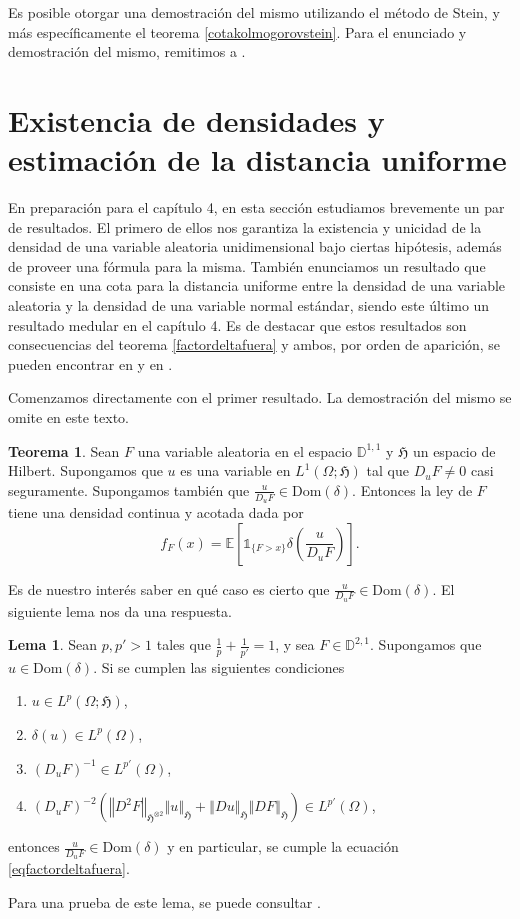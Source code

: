 \documentclass[letterpaper,twoside,12pt]{book}
\newcommand{\D}{\mathbb{D}}
\newcommand{\E}{\mathbb{E}}
\newcommand{\1}{\mathds{1}}
\newcommand{\norm}[1]{\left\Vert #1 \right\Vert}
\theoremstyle{definition}
\theoremstyle{definition}
\newtheorem{teo}{Teorema}
\theoremstyle{remark}
\theoremstyle{definition}
\theoremstyle{definition}
\theoremstyle{definition}
\theoremstyle{definition}
\theoremstyle{definition}
\newtheorem{lema}{Lema}
\begin{document}
Es posible otorgar una demostración del mismo utilizando el método de Stein, y más específicamente el teorema \ref{cotakolmogorovstein}. Para el enunciado y demostración del mismo, remitimos a \cite[sección 3.7]{Nourdin_Peccati_2012}.

\section{Existencia de densidades y estimación de la distancia uniforme}

En preparación para el capítulo 4, en esta sección estudiamos brevemente un par de resultados. El primero de ellos nos garantiza la existencia y unicidad de la densidad de una variable aleatoria unidimensional bajo ciertas hipótesis, además de proveer una fórmula para la misma. También enunciamos un resultado que consiste en una cota para la distancia uniforme entre la densidad de una variable aleatoria y la densidad de una variable normal estándar, siendo este último un resultado medular en el capítulo 4. Es de destacar que estos resultados son consecuencias del teorema \ref{factordeltafuera} y ambos, por orden de aparición, se pueden encontrar en \cite[proposición 1]{Caballero1998-hz} y en \cite[teorema 3.2]{KUZGUN202268}.

Comenzamos directamente con el primer resultado. La demostración del mismo se omite en este texto.
\begin{teo}\label{existdensidad}
 Sean $F$ una variable aleatoria en el espacio $\D^{1,1}$ y $\mathfrak{H}$ un espacio de Hilbert. Supongamos que $u$ es una variable en $L^{1}(\Omega;\mathfrak{H})$ tal que $D_uF\neq 0$ casi seguramente. Supongamos también que $\tfrac{u}{D_uF}\in \text{Dom}(\delta)$. Entonces la ley de $F$ tiene una densidad continua y acotada dada por 
   \begin{equation}\label{formuladensidad}
      f_F(x)=\E\left[\1_{\{F>x\}}\delta \left(\frac{u}{D_uF}\right)\right].
   \end{equation}
 \end{teo}
Es de nuestro interés saber en qué caso es cierto que $\tfrac{u}{D_uF}\in \text{Dom}(\delta)$. El siguiente lema nos da una respuesta.

\begin{lema}\label{lemaexistdensidad}
 Sean $p,p'>1$ tales que $\frac{1}{p}+\frac{1}{p'}=1$, y sea $F\in \D^{2,1}$. Supongamos que $u\in \text{Dom}(\delta)$. Si se cumplen las siguientes condiciones 
 \begin{enumerate}
   \item $u\in L^{p}(\Omega;\mathfrak{H})$,
   \item $\delta(u)\in L^{p}(\Omega)$,
   \item $(D_uF)^{-1}\in L^{p'}(\Omega)$,
   \item $(D_uF)^{-2}\left(\norm{D^2F}_{\mathfrak{H}^{\otimes 2}}\norm{u}_{\mathfrak{H}}+\norm{Du}_{\mathfrak{H}}\norm{DF}_{\mathfrak{H}}\right)\in L^{p'}(\Omega)$,
 \end{enumerate}
 entonces $\tfrac{u}{D_uF}\in \text{Dom}(\delta)$ y en particular, se cumple la ecuación \eqref{eqfactordeltafuera}. 
 \end{lema}
 Para una prueba de este lema, se puede consultar \cite[lema 3, lema 4]{Caballero1998-hz}.
\end{document}
